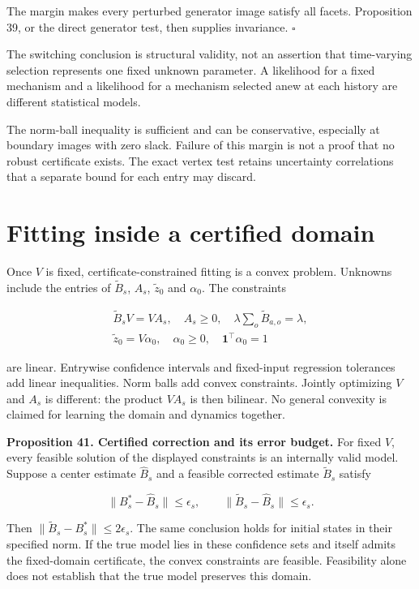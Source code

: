 The margin makes every perturbed generator image satisfy all facets.
Proposition 39, or the direct generator test, then supplies invariance.
\(\square\)

The switching conclusion is structural validity, not an assertion that
time-varying selection represents one fixed unknown parameter. A
likelihood for a fixed mechanism and a likelihood for a mechanism
selected anew at each history are different statistical models.

The norm-ball inequality is sufficient and can be conservative,
especially at boundary images with zero slack. Failure of this margin is
not a proof that no robust certificate exists. The exact vertex test
retains uncertainty correlations that a separate bound for each entry
may discard.

\section{Fitting inside a certified domain}\label{LSM:fitting-inside-a-certified-domain}

Once \(V\) is fixed, certificate-constrained fitting is a convex
problem. Unknowns include the entries of \(\widetilde B_s\), \(A_s\),
\(\widetilde z_0\) and \(\alpha_0\). The constraints

\[
\begin{gathered}
\widetilde B_sV=VA_s,\quad A_s\geq0,
\quad \lambda\sum_o\widetilde B_{a,o}=\lambda,\\
\widetilde z_0=V\alpha_0,\quad\alpha_0\geq0,
\quad\mathbf1^\top\alpha_0=1
\end{gathered}
\]

are linear. Entrywise confidence intervals and fixed-input regression
tolerances add linear inequalities. Norm balls add convex constraints.
Jointly optimizing \(V\) and \(A_s\) is different: the product \(VA_s\)
is then bilinear. No general convexity is claimed for learning the
domain and dynamics together.

\textbf{Proposition 41. Certified correction and its error budget.} For
fixed \(V\), every feasible solution of the displayed constraints is an
internally valid model. Suppose a center estimate \(\widehat B_s\) and a
feasible corrected estimate \(\widetilde B_s\) satisfy

\[
\|B_s^*-\widehat B_s\|\leq\epsilon_s,
\qquad
\|\widetilde B_s-\widehat B_s\|\leq\epsilon_s.
\]

Then \(\|\widetilde B_s-B_s^*\|\leq2\epsilon_s\). The same conclusion
holds for initial states in their specified norm. If the true model lies
in these confidence sets and itself admits the fixed-domain certificate,
the convex constraints are feasible. Feasibility alone does not
establish that the true model preserves this domain.


